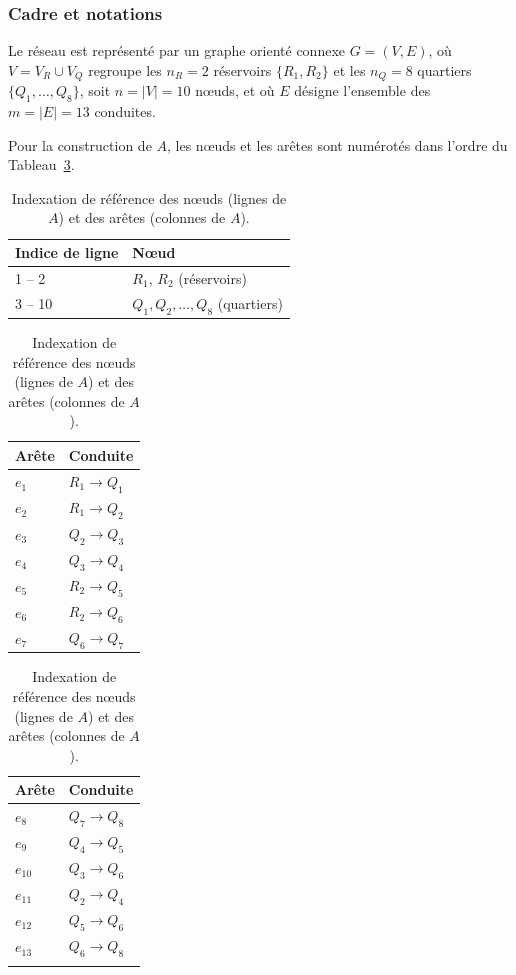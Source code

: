 \documentclass[11pt]{ama-article}
\begin{document}
\subsubsection{Cadre et notations}

Le réseau est représenté par un graphe orienté connexe $G=(V,E)$, où $V=V_R\cup V_Q$ regroupe
les $n_R=2$ réservoirs $\{R_1,R_2\}$ et les $n_Q=8$ quartiers $\{Q_1,\dots,Q_8\}$, soit
$n=|V|=10$ nœuds, et où $E$ désigne l'ensemble des $m=|E|=13$ conduites.

Pour la construction de $A$, les nœuds et les arêtes sont numérotés dans l'ordre du
Tableau~\ref{tab:indexation}.

\begin{table}[h]
\centering
\begin{tabular}{@{}ll@{}}
\toprule
Indice de ligne & Nœud \\
\midrule
1 -- 2 & $R_1$, $R_2$ (réservoirs) \\
3 -- 10 & $Q_1, Q_2, \dots, Q_8$ (quartiers) \\
\bottomrule
\end{tabular}
\qquad
\begin{tabular}{@{}ll@{}}
\toprule
Arête & Conduite \\
\midrule
$e_1$ & $R_1 \to Q_1$ \\
$e_2$ & $R_1 \to Q_2$ \\
$e_3$ & $Q_2 \to Q_3$ \\
$e_4$ & $Q_3 \to Q_4$ \\
$e_5$ & $R_2 \to Q_5$ \\
$e_6$ & $R_2 \to Q_6$ \\
$e_7$ & $Q_6 \to Q_7$ \\
\bottomrule
\end{tabular}
\qquad
\begin{tabular}{@{}ll@{}}
\toprule
Arête & Conduite \\
\midrule
$e_8$ & $Q_7 \to Q_8$ \\
$e_9$ & $Q_4 \to Q_5$ \\
$e_{10}$ & $Q_3 \to Q_6$ \\
$e_{11}$ & $Q_2 \to Q_4$ \\
$e_{12}$ & $Q_5 \to Q_6$ \\
$e_{13}$ & $Q_6 \to Q_8$ \\
& \\
\bottomrule
\end{tabular}
\caption{Indexation de référence des nœuds (lignes de $A$) et des arêtes (colonnes de $A$).}
\label{tab:indexation}
\end{table}
\end{document}
